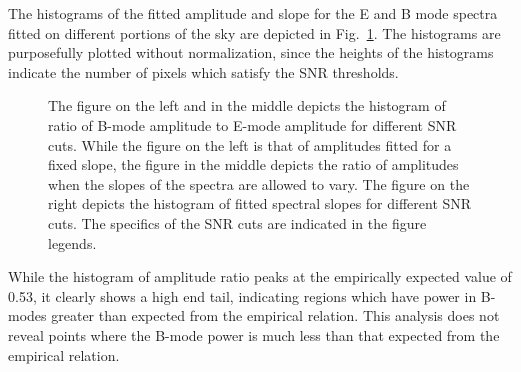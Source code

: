 \documentclass[12pt]{article}
\begin{document}
The histograms of the fitted amplitude and slope for the E and B mode spectra fitted on different portions of the sky are depicted in Fig.~\ref{fig:amp_slope_stats}. The histograms are purposefully plotted without normalization, since the heights of the histograms indicate the number of pixels which satisfy the SNR thresholds. 
\begin{figure}[!h]
\centering
{}
\caption{The figure on the left and in the middle depicts the histogram of ratio of B-mode amplitude to E-mode amplitude for different SNR cuts. While the figure on the left is that of amplitudes fitted for a fixed slope, the figure in the middle depicts the ratio of amplitudes when the slopes of the spectra are allowed to vary. The figure on the right depicts the histogram of fitted spectral slopes for different SNR cuts. The specifics of the SNR cuts are indicated in the figure legends.}
\label{fig:amp_slope_stats}
\end{figure}

While the histogram of amplitude ratio peaks at the empirically expected value of 0.53, it clearly shows a high end tail, indicating regions which have power in B-modes greater than expected from the empirical relation. This analysis does not reveal points where the B-mode power is much less than that expected from the empirical relation.  
 
\end{document}
